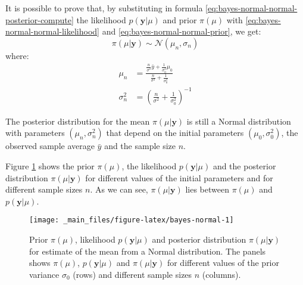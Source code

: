 \documentclass[a4paper, nobind]{templates/ociamthesis}
\theoremstyle{definition}
\theoremstyle{definition}
\theoremstyle{definition}
\theoremstyle{remark}
\begin{document}
It is possible to prove that, by substituting in formula \eqref{eq:bayes-normal-normal-posterior-compute} the likelihood \(p(\boldsymbol{y}|\mu)\) and prior \(\pi(\mu)\) with \eqref{eq:bayes-normal-normal-likelihood} and \eqref{eq:bayes-normal-normal-prior}, we get:
\begin{equation}
\label{eq:bayes-normal-normal-posterior-result}
\pi(\mu|\boldsymbol{y}) \sim \mathcal{N}\left(  \mu_n, \sigma_n \right)
\end{equation}
where:
\begin{align}
\label{eq:bayes-normal-normal-mu}
\mu_n & = \frac{\frac{n}{\sigma^2}\bar{y} + \frac{1}{\sigma_0^2}\mu_0}{ \frac{n}{\sigma^2} + \frac{1}{\sigma_0^2}} \\
\label{eq:bayes-normal-normal-sigma}
\sigma_n^2 & = \left( \frac{n}{\sigma^2} + \frac{1}{\sigma_0^2} \right)^{-1}
\end{align}

The posterior distribution for the mean \(\pi(\mu|\boldsymbol{y})\) is still a Normal distribution with parameters \((\mu_n, \sigma_n^2)\) that depend on the initial parameters \((\mu_0, \sigma_0^2)\), the observed sample average \(\bar{y}\) and the sample size \(n\).

Figure \ref{fig:bayes-normal} shows the prior \(\pi(\mu)\), the likelihood \(p(\boldsymbol{y}|\mu)\) and the posterior distribution \(\pi(\mu|\boldsymbol{y})\) for different values of the initial parameters and for different sample sizes \(n\). As we can see, \(\pi(\mu|\boldsymbol{y})\) lies between \(\pi(\mu)\) and \(p(\boldsymbol{y}|\mu)\).





\begin{figure}[!hbtp]

{\centering \texttt{[image: \_main\_files/figure-latex/bayes-normal-1]} 

}

\caption[Prior \(\pi(\mu)\), likelihood \(p(\boldsymbol{y}|\mu)\) and posterior distribution \(\pi(\mu|\boldsymbol{y})\) for estimate of the mean from a Normal distribution.]{Prior \(\pi(\mu)\), likelihood \(p(\boldsymbol{y}|\mu)\) and posterior distribution \(\pi(\mu|\boldsymbol{y})\) for estimate of the mean from a Normal distribution. The panels shows \(\pi(\mu)\), \(p(\boldsymbol{y}|\mu)\) and \(\pi(\mu|\boldsymbol{y})\) for different values of the prior variance \(\sigma_0\) (rows) and different sample sizes \(n\) (columns).}\label{fig:bayes-normal}
\end{figure}
\end{document}
